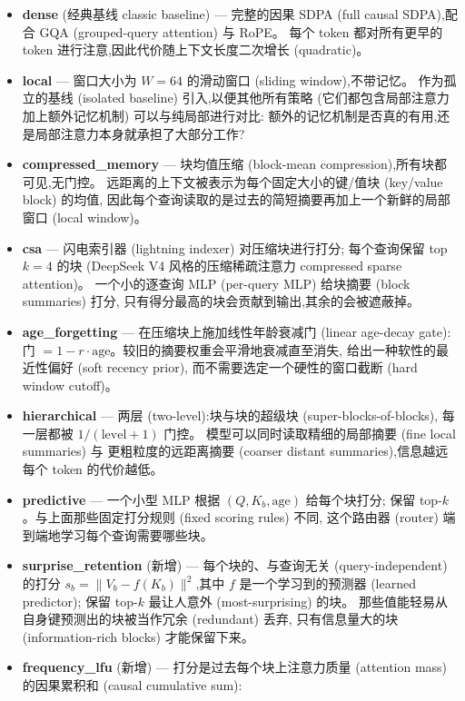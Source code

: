\documentclass[10pt,UTF8]{ctexart}
\begin{document}
\begin{itemize}
\item \textbf{dense} (经典基线 classic baseline) ---
完整的因果 SDPA (full causal SDPA),配合 GQA (grouped-query attention) 与 RoPE。
每个 token 都对所有更早的 token 进行注意,因此代价随上下文长度二次增长 (quadratic)。
\item \textbf{local} --- 窗口大小为 $W=64$ 的滑动窗口 (sliding window),不带记忆。
作为孤立的基线 (isolated baseline) 引入,以便其他所有策略
(它们都包含局部注意力加上额外记忆机制) 可以与纯局部进行对比:
额外的记忆机制是否真的有用,还是局部注意力本身就承担了大部分工作?
\item \textbf{compressed\_memory} --- 块均值压缩 (block-mean compression),所有块都可见,无门控。
远距离的上下文被表示为每个固定大小的键/值块 (key/value block) 的均值,
因此每个查询读取的是过去的简短摘要再加上一个新鲜的局部窗口 (local window)。
\item \textbf{csa} --- 闪电索引器 (lightning indexer) 对压缩块进行打分;
每个查询保留 top $k=4$ 的块 (DeepSeek V4 风格的压缩稀疏注意力 compressed sparse attention)。
一个小的逐查询 MLP (per-query MLP) 给块摘要 (block summaries) 打分,
只有得分最高的块会贡献到输出,其余的会被遮蔽掉。
\item \textbf{age\_forgetting} --- 在压缩块上施加线性年龄衰减门 (linear age-decay gate):
门 $=1-r\cdot \text{age}$。较旧的摘要权重会平滑地衰减直至消失,
给出一种软性的最近性偏好 (soft recency prior),
而不需要选定一个硬性的窗口截断 (hard window cutoff)。
\item \textbf{hierarchical} --- 两层 (two-level):块与块的超级块 (super-blocks-of-blocks),
每一层都被 $1/(\text{level}+1)$ 门控。
模型可以同时读取精细的局部摘要 (fine local summaries) 与
更粗粒度的远距离摘要 (coarser distant summaries),信息越远每个 token 的代价越低。
\item \textbf{predictive} --- 一个小型 MLP 根据 $(Q, K_b, \text{age})$ 给每个块打分;
保留 top-$k$。与上面那些固定打分规则 (fixed scoring rules) 不同,
这个路由器 (router) 端到端地学习每个查询需要哪些块。
\item \textbf{surprise\_retention} (新增) ---
每个块的、与查询无关 (query-independent) 的打分
$s_b = \|V_b - f(K_b)\|^2$,其中 $f$ 是一个学习到的预测器 (learned predictor);
保留 top-$k$ 最让人意外 (most-surprising) 的块。
那些值能轻易从自身键预测出的块被当作冗余 (redundant) 丢弃,
只有信息量大的块 (information-rich blocks) 才能保留下来。
\item \textbf{frequency\_lfu} (新增) ---
打分是过去每个块上注意力质量 (attention mass) 的因果累积和 (causal cumulative sum):

\end{itemize}
\end{document}
